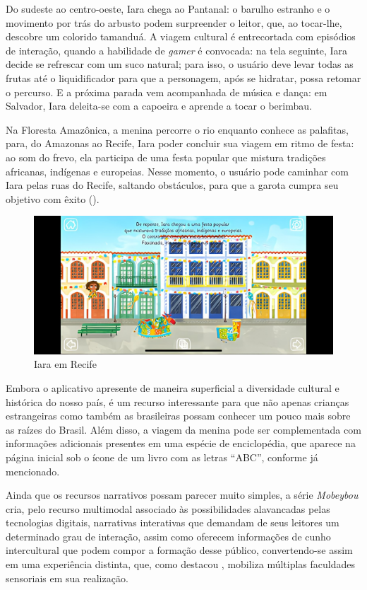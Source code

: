 \documentclass[portuguese]{textolivre}
\begin{document}
Do sudeste ao centro-oeste, Iara chega ao Pantanal: o barulho estranho e o
movimento por trás do arbusto podem surpreender o leitor, que, ao tocar-lhe,
descobre um colorido tamanduá. A viagem cultural é entrecortada com episódios
de interação, quando a habilidade de \textit{gamer} é convocada: na tela
seguinte, Iara decide se refrescar com um suco natural; para isso, o usuário
deve levar todas as frutas até o liquidificador para que a personagem, após se
hidratar, possa retomar o percurso. E a próxima parada vem acompanhada de
música e dança: em Salvador, Iara deleita-se com a capoeira e aprende a tocar o
berimbau.

Na Floresta Amazônica, a menina percorre o rio enquanto conhece as palafitas,
para, do Amazonas ao Recife, Iara poder concluir sua viagem em ritmo de festa:
ao som do frevo, ela participa de uma festa popular que mistura tradições
africanas, indígenas e europeias. Nesse momento, o usuário pode caminhar com
Iara pelas ruas do Recife, saltando obstáculos, para que a garota cumpra seu
objetivo com êxito ().

\begin{figure}[htbp]
    \centering
    \includegraphics[width=0.85\linewidth]{Fig5.jpeg}
    \caption{Iara em Recife}
    \label{fig5}
\end{figure}

Embora o aplicativo apresente de maneira superficial a diversidade cultural e
histórica do nosso país, é um recurso interessante para que não apenas crianças
estrangeiras como também as brasileiras possam conhecer um pouco mais sobre as
raízes do Brasil. Além disso, a viagem da menina pode ser complementada com
informações adicionais presentes em uma espécie de enciclopédia, que aparece na
página inicial sob o ícone de um livro com as letras “ABC”, conforme já
mencionado.

Ainda que os recursos narrativos possam parecer muito simples, a série
\textit{Mobeybou} cria, pelo recurso multimodal associado às possibilidades
alavancadas pelas tecnologias digitais, narrativas interativas que demandam de
seus leitores um determinado grau de interação, assim como oferecem informações
de cunho intercultural que podem compor a formação desse público,
convertendo-se assim em uma experiência distinta, que, como destacou
\textcite{ellestrom_modalities_2021}, mobiliza múltiplas faculdades sensoriais
em sua realização.
\end{document}
